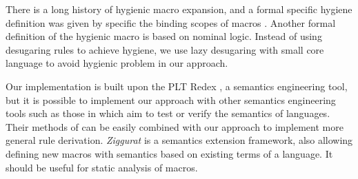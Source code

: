 There is a long history of hygienic macro expansion\cite{hygienicmacro}, and a formal specific hygiene definition was given by specific the binding scopes of macros \cite{10.5555/1792878.1792884}. Another formal definition of the hygienic macro\cite{EssenceofHygiene} is based on nominal logic\cite{10.1007/s001650200016}. Instead of using desugaring rules to achieve hygiene, we use lazy desugaring with small core language to avoid hygienic problem in our approach.
%

Our implementation is built upon the PLT Redex \cite{SEwPR}, a semantics engineering tool, but it is possible to implement our approach with other semantics engineering tools such as those in \cite{dynsem,Ksemantic} which aim to test or verify the semantics of languages. Their methods of can be easily combined with our approach to implement more general rule derivation. \emph{Ziggurat} \cite{Ziggurat} is a semantics extension framework, also allowing defining new macros with semantics based on existing terms of a language. It should be useful for static analysis of macros.
